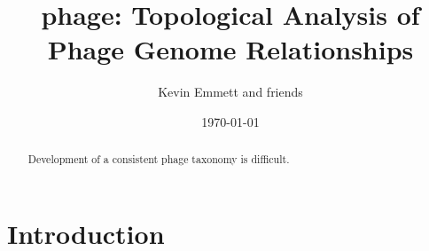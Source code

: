 \documentclass[12pt]{article}
\begin{document}
\title{phage: Topological Analysis of Phage Genome Relationships}
\author{Kevin Emmett and friends}
\date{\today}

\maketitle

\begin{abstract}
    Development of a consistent phage taxonomy is difficult.
\end{abstract}

\section{Introduction}
\end{document}

